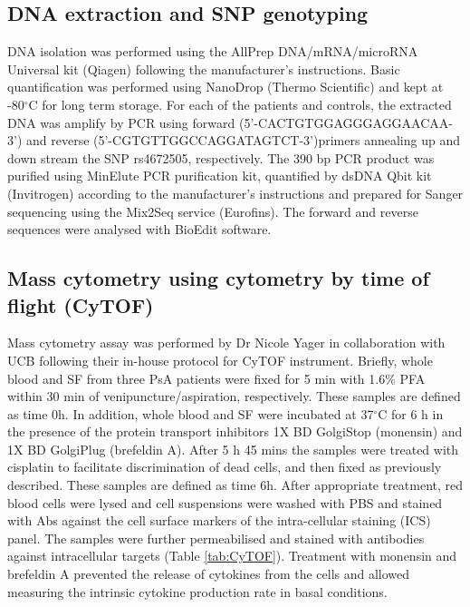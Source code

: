 \subsection{DNA extraction and SNP genotyping}
DNA isolation was performed using the AllPrep DNA/mRNA/microRNA Universal kit (Qiagen) following the manufacturer's instructions. Basic quantification was performed using NanoDrop (Thermo Scientific) and kept at -80{$^\circ$}C for long term storage. For each of the patients and controls, the extracted DNA was amplify by PCR using forward (5'-CACTGTGGAGGGAGGAACAA-3') and reverse (5'-CGTGTTGGCCAGGATAGTCT-3')primers annealing up and down stream the SNP rs4672505, respectively. The 390 bp PCR product was purified using MinElute PCR purification kit, quantified by dsDNA Qbit kit (Invitrogen) according to the manufacturer's instructions and prepared for Sanger sequencing using the Mix2Seq service (Eurofins). The forward and reverse sequences were analysed with BioEdit software.



\subsection{Mass cytometry using cytometry by time of flight (CyTOF)}
Mass cytometry assay was performed by Dr Nicole Yager in collaboration with UCB following their in-house protocol for CyTOF instrument. Briefly, whole blood and SF from three PsA patients were fixed for 5 min with 1.6\% PFA within 30 min of venipuncture/aspiration, respectively. These samples are defined as time 0h. In addition, whole blood and SF were incubated at 37{$^\circ$}C for 6 h in the presence of the protein transport inhibitors 1X BD GolgiStop (monensin) and 1X BD GolgiPlug (brefeldin A). After 5 h 45 mins the samples were treated with cisplatin to facilitate discrimination of dead cells, and then fixed as previously described.  These samples are defined as time 6h. After appropriate treatment, red blood cells were lysed and cell suspensions were washed with PBS and stained with Abs against the cell surface markers of the intra-cellular staining (ICS) panel.  The samples were further permeabilised and stained with antibodies against intracellular targets (Table \ref{tab:CyTOF}). Treatment with monensin and brefeldin A prevented the release of cytokines from the cells and allowed measuring the intrinsic cytokine production rate in basal conditions. 


